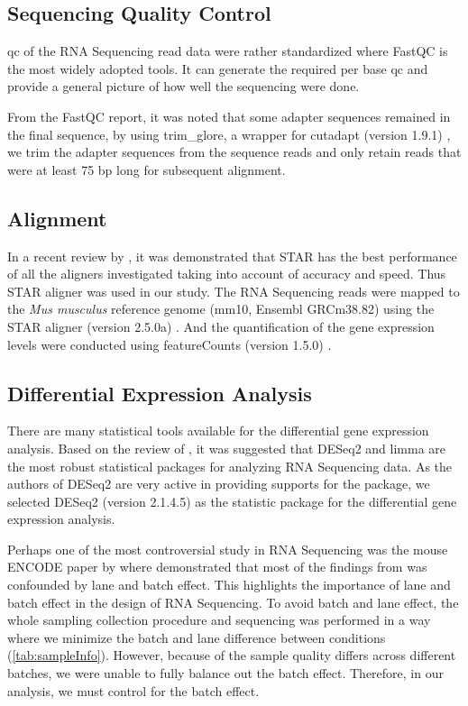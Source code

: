 \subsection{Sequencing Quality Control}
\Gls{qc} of the RNA Sequencing read data were rather standardized where FastQC \citep{Andrews2010} is the most widely adopted tools.
It can generate the required per base \gls{qc} and provide a general picture of how well the sequencing were done.

From the FastQC report, it was noted that some adapter sequences remained in the final sequence, by using trim\_glore, a wrapper for cutadapt (version 1.9.1) \citep{Martin2011}, we trim the adapter sequences from the sequence reads and only retain reads that were at least 75 \gls{bp} long for subsequent alignment. 

\subsection{Alignment}
In a recent review by \citet{Engstrom2013}, it was demonstrated that STAR \citep{Dobin2013} has the best performance of all the aligners investigated taking into account of accuracy and speed.
Thus STAR aligner was used in our study.
The RNA Sequencing reads were mapped to the \textit{Mus musculus} reference genome (mm10, Ensembl GRCm38.82) using the STAR aligner (version 2.5.0a) \citep{Dobin2013}.
And the quantification of the gene expression levels were conducted using featureCounts (version 1.5.0) \citep{Liao2014}.

\subsection{Differential Expression Analysis}
There are many statistical tools available for the differential gene expression analysis.
Based on the review of \citet{Seyednasrollah2015}, it was suggested that DESeq2 and limma are the most robust statistical packages for analyzing RNA Sequencing data. 
As the authors of DESeq2 are very active in providing supports for the package, we selected DESeq2 (version 2.1.4.5) \citep{Love2014} as the statistic package for the differential gene expression analysis.

Perhaps one of the most controversial study in RNA Sequencing was the mouse ENCODE paper by \citet{Yue2014} where \citet{Gilad2015} demonstrated that most of the findings from \citet{Yue2014} was confounded by lane and batch effect.
This highlights the importance of lane and batch effect in the design of RNA Sequencing.
To avoid batch and lane effect, the whole sampling collection procedure and sequencing was performed in a way where we minimize the batch and lane difference between conditions (\cref{tab:sampleInfo}). 
However, because of the sample quality differs across different batches, we were unable to fully balance out the batch effect. 
Therefore, in our analysis, we must control for the batch effect.

